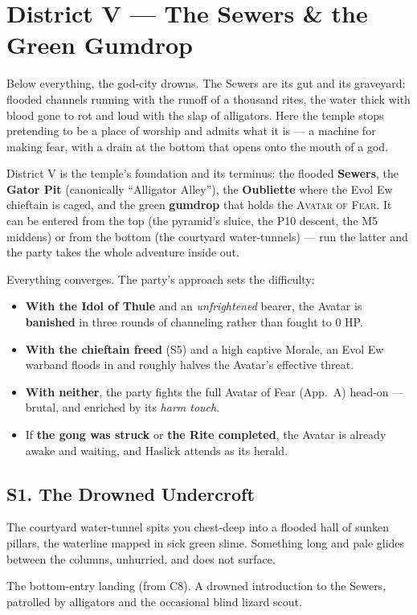 \documentclass[10pt,twoside]{article}
\newcommand{\eqname}[1]{\textsc{#1}}
\begin{document}
\section{District V --- The Sewers \& the Green Gumdrop}

\begin{readaloud}
Below everything, the god-city drowns. The Sewers are its gut and its graveyard:
flooded channels running with the runoff of a thousand rites, the water thick with
blood gone to rot and loud with the slap of alligators. Here the temple stops
pretending to be a place of worship and admits what it is --- a machine for making
fear, with a drain at the bottom that opens onto the mouth of a god.
\end{readaloud}

District V is the temple's foundation and its terminus: the flooded \textbf{Sewers},
the \textbf{Gator Pit} (canonically ``Alligator Alley''), the \textbf{Oubliette}
where the Evol Ew chieftain is caged, and the green \textbf{gumdrop} that holds the
\eqname{Avatar of Fear}. It can be entered from the top (the pyramid's sluice, the
P10 descent, the M5 middens) or from the bottom (the courtyard water-tunnels) --- run
the latter and the party takes the whole adventure inside out.

\begin{dmnote}
Everything converges. The party's approach sets the difficulty:
\begin{itemize}
\item \textbf{With the Idol of Thule} and an \emph{unfrightened} bearer, the Avatar is
\textbf{banished} in three rounds of channeling rather than fought to 0 HP.
\item \textbf{With the chieftain freed} (S5) and a high captive Morale, an Evol Ew
warband floods in and roughly halves the Avatar's effective threat.
\item \textbf{With neither}, the party fights the full Avatar of Fear (App.\ A) head-on
--- brutal, and enriched by its \emph{harm touch}.
\item If \textbf{the gong was struck} or \textbf{the Rite completed}, the Avatar is
already awake and waiting, and Haslick attends as its herald.
\end{itemize}
\end{dmnote}

\subsection{S1. The Drowned Undercroft}
\begin{readaloud}
The courtyard water-tunnel spits you chest-deep into a flooded hall of sunken
pillars, the waterline mapped in sick green slime. Something long and pale glides
between the columns, unhurried, and does not surface.
\end{readaloud}
The bottom-entry landing (from C8). A drowned introduction to the Sewers, patrolled by
alligators and the occasional blind lizard scout.
\end{document}
